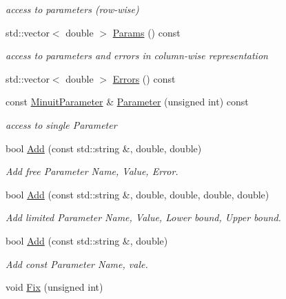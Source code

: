 \begin{DoxyCompactItemize}
\begin{DoxyCompactList}\small\item\em access to parameters (row-\/wise) \end{DoxyCompactList}\item 
std\+::vector$<$ double $>$ \mbox{\hyperlink{classROOT_1_1Minuit2_1_1MnUserParameters_a0f718b770e7fbeb503f83d8f27ca10f0}{Params}} () const
\begin{DoxyCompactList}\small\item\em access to parameters and errors in column-\/wise representation \end{DoxyCompactList}\item 
std\+::vector$<$ double $>$ \mbox{\hyperlink{classROOT_1_1Minuit2_1_1MnUserParameters_a7cae98f6146725427e852655cee7a857}{Errors}} () const
\item 
const \mbox{\hyperlink{classROOT_1_1Minuit2_1_1MinuitParameter}{Minuit\+Parameter}} \& \mbox{\hyperlink{classROOT_1_1Minuit2_1_1MnUserParameters_a12ee4c4660c21a660fb5f9d1f30b2fc2}{Parameter}} (unsigned int) const
\begin{DoxyCompactList}\small\item\em access to single Parameter \end{DoxyCompactList}\item 
bool \mbox{\hyperlink{classROOT_1_1Minuit2_1_1MnUserParameters_a95405d43b783605dba2ead1ba3125ebc}{Add}} (const std\+::string \&, double, double)
\begin{DoxyCompactList}\small\item\em Add free Parameter Name, Value, Error. \end{DoxyCompactList}\item 
bool \mbox{\hyperlink{classROOT_1_1Minuit2_1_1MnUserParameters_ab5e82031e879bf6937975b884784c126}{Add}} (const std\+::string \&, double, double, double, double)
\begin{DoxyCompactList}\small\item\em Add limited Parameter Name, Value, Lower bound, Upper bound. \end{DoxyCompactList}\item 
bool \mbox{\hyperlink{classROOT_1_1Minuit2_1_1MnUserParameters_acb750b2b34d2a7a233f559d6820bbb35}{Add}} (const std\+::string \&, double)
\begin{DoxyCompactList}\small\item\em Add const Parameter Name, vale. \end{DoxyCompactList}\item 
void \mbox{\hyperlink{classROOT_1_1Minuit2_1_1MnUserParameters_a53ce277313d9e1f8503e7ffbf8e7bce4}{Fix}} (unsigned int)

\end{DoxyCompactItemize}
